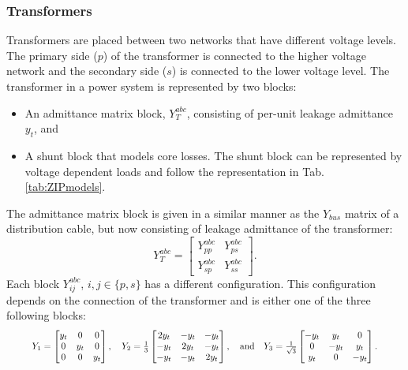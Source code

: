 \documentclass[10pt,journal]{article}
\begin{document}
\subsubsection{Transformers}
Transformers are placed between two networks that have different voltage levels. The primary side ($p$) of the transformer is connected to the higher voltage network and the secondary side ($s$) is connected to the lower voltage level. The transformer in a power system is represented by two blocks:
\begin{itemize}
    \item An admittance matrix block, $Y^{abc}_T$, consisting of per-unit leakage admittance $y_t$, and  
    \item A shunt block that models core losses. The shunt block can be represented by voltage dependent loads and follow the representation in Tab. \ref{tab:ZIPmodels}. 
\end{itemize}
The admittance matrix block is given in a similar manner as the $Y_{bus}$ matrix of a distribution cable, but now consisting of leakage admittance of the transformer: \begin{equation}
    Y^{abc}_T = \begin{bmatrix}
    Y_{pp}^{abc} & Y^{abc}_{ps} \\
     Y_{sp}^{abc} & Y^{abc}_{ss}
    \end{bmatrix}.
\end{equation}
Each block $Y^{abc}_{ij}$, $i,j\in\{p,s\}$ has a different configuration. This configuration depends on the connection of the transformer and is either one of the three following blocks: \begin{equation}\resizebox{0.91\columnwidth}{!}{%
$
    Y_1=\begin{bmatrix}
    y_t & 0 & 0 \\
    0 & y_t & 0 \\
    0 & 0 & y_t
    \end{bmatrix},\quad Y_2=\frac{1}{3}\begin{bmatrix}
    2y_t & -y_t & -y_t \\
    -y_t & 2y_t & -y_t \\
    -y_t & -y_t & 2y_t
    \end{bmatrix},\quad\mbox{and}\quad Y_3=\frac{1}{\sqrt{3}}\begin{bmatrix}
    -y_t & y_t & 0 \\
    0 & -y_t & y_t \\
    y_t & 0 & -y_t 
    \end{bmatrix}. $%
    }
\end{equation}
\end{document}
